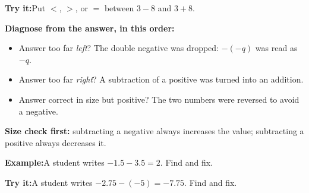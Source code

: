 \documentclass[12pt]{article}
\begin{document}
\begin{tryitbox}
\textbf{Try it:}\quad Put $<$, $>$, or $=$ between $3 - 8$ and $3 + 8$.\\[2pt]
\end{tryitbox}


\begin{formulabox}
\textbf{Diagnose from the answer, in this order:}
\begin{itemize}[leftmargin=0.8cm, itemsep=0pt, topsep=1pt]
  \item Answer too far \emph{left}? The double negative was dropped: $-(-q)$ was read as $-q$.
  \item Answer too far \emph{right}? A subtraction of a positive was turned into an addition.
  \item Answer correct in size but positive? The two numbers were reversed to avoid a negative.
\end{itemize}
\textbf{Size check first:} subtracting a negative always increases the value; subtracting a positive always decreases it.
\end{formulabox}

\begin{examplebox}
\textbf{Example:}\quad A student writes $-1.5 - 3.5 = 2$. Find and fix.
\end{examplebox}

\begin{tryitbox}
\textbf{Try it:}\quad A student writes $-2.75 - (-5) = -7.75$. Find and fix.\\[2pt]
\end{tryitbox}
\end{document}
